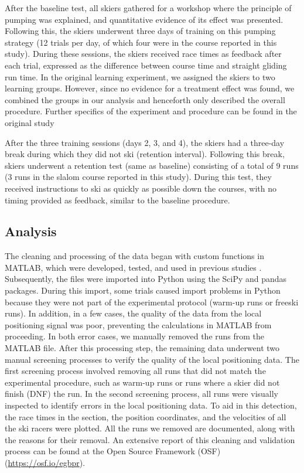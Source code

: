 \documentclass{article}
\begin{document}
After the baseline test, all skiers gathered for a workshop where the principle of pumping was explained, and quantitative evidence of its effect was presented. Following this, the skiers underwent three days of training on this pumping strategy (12 trials per day, of which four were in the course reported in this study). During these sessions, the skiers received race times as feedback after each trial, expressed as the difference between course time and straight gliding run time. In the original learning experiment, we assigned the skiers to two learning groups. However, since no evidence for a treatment effect was found, we combined the groups in our analysis and henceforth only described the overall procedure.  Further specifics of the experiment and procedure can be found in the original study \cite{magelssen_is_2022}

After the three training sessions (days 2, 3, and 4), the skiers had a three-day break during which they did not ski (retention interval). Following this break, skiers underwent a retention test (same as baseline) consisting of a total of 9 runs (3 runs in the slalom course reported in this study). During this test, they received instructions to ski as quickly as possible down the courses, with no timing provided as feedback, similar to the baseline procedure. 


\subsection{Analysis}
The cleaning and processing of the data began with custom functions in MATLAB, which were developed, tested, and used in previous studies \cite{reid_kinematic_2010}. Subsequently, the files were imported into Python using the SciPy \cite{virtanen_scipy_2020} and pandas \cite{mckinney_pandas-powerful_2015} packages. During this import, some trials caused import problems in Python because they were not part of the experimental protocol (warm-up runs or freeski runs). In addition, in a few cases, the quality of the data from the local positioning signal was poor, preventing the calculations in MATLAB from proceeding. In both error cases, we manually removed the runs from the MATLAB file. After this processing step, the remaining data underwent two manual screening processes to verify the quality of the local positioning data. The first screening process involved removing all runs that did not match the experimental procedure, such as warm-up runs or runs where a skier did not finish (DNF) the run. In the second screening process, all runs were visually inspected to identify errors in the local positioning data. To aid in this detection, the race times in the section, the position coordinates, and the velocities of all the ski racers were plotted. All the runs we removed are documented, along with the reasons for their removal. An extensive report of this cleaning and validation process can be found at the Open Source Framework (OSF)  (\url{https://osf.io/egbpr}).
\end{document}
